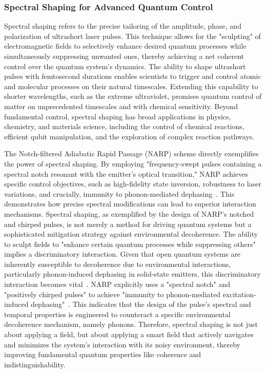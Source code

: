 \documentclass{article}
\begin{document}
\subsubsection{Spectral Shaping for Advanced Quantum Control}
Spectral shaping refers to the precise tailoring of the amplitude, phase, and polarization of ultrashort laser pulses. This technique allows for the "sculpting" of electromagnetic fields to selectively enhance desired quantum processes while simultaneously suppressing unwanted ones, thereby achieving a net coherent control over the quantum system's dynamics. The ability to shape ultrashort pulses with femtosecond durations enables scientists to trigger and control atomic and molecular processes on their natural timescales. Extending this capability to shorter wavelengths, such as the extreme ultraviolet, promises quantum control of matter on unprecedented timescales and with chemical sensitivity. Beyond fundamental control, spectral shaping has broad applications in physics, chemistry, and materials science, including the control of chemical reactions, efficient qubit manipulation, and the exploration of complex reaction pathways.

The Notch-filtered Adiabatic Rapid Passage (NARP) scheme directly exemplifies the power of spectral shaping. By employing "frequency-swept pulses containing a spectral notch resonant with the emitter's optical transition," NARP achieves specific control objectives, such as high-fidelity state inversion, robustness to laser variations, and crucially, immunity to phonon-mediated dephasing~\cite{Wilbur2022NotchfilteredAR}. This demonstrates how precise spectral modifications can lead to superior interaction mechanisms. Spectral shaping, as exemplified by the design of NARP's notched and chirped pulses, is not merely a method for driving quantum systems but a sophisticated mitigation strategy against environmental decoherence. The ability to sculpt fields to "enhance certain quantum processes while suppressing others" implies a discriminatory interaction. Given that open quantum systems are inherently susceptible to decoherence due to environmental interactions, particularly phonon-induced dephasing in solid-state emitters, this discriminatory interaction becomes vital~\cite{Lker2019ARO}. NARP explicitly uses a "spectral notch" and "positively chirped pulses" to achieve "immunity to phonon-mediated excitation-induced dephasing"~\cite{Wilbur2022NotchfilteredAR}. This indicates that the design of the pulse's spectral and temporal properties is engineered to counteract a specific environmental decoherence mechanism, namely phonons. Therefore, spectral shaping is not just about applying a field, but about applying a smart field that actively navigates and minimizes the system's interaction with its noisy environment, thereby improving fundamental quantum properties like coherence and indistinguishability.
\end{document}
